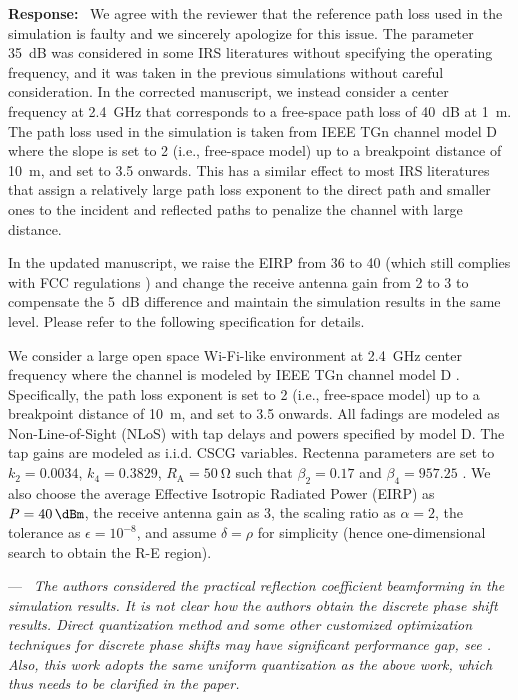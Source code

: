 \documentclass{article}
\newcounter{reviewer}
\newcounter{point}[reviewer]
\newcounter{response}[reviewer]
\renewcommand{\thepoint}
	{\thereviewer.\arabic{point}}
\newenvironment{point}
	{\refstepcounter{point} \bigskip \noindent {\textbf{Comment~\thepoint} } ---\ \itshape}
	{\par}
\newenvironment{response}
	{\refstepcounter{response} \medskip \noindent \textbf{Response:}\ }
	{\medskip}
\begin{document}
\begin{reviewer}
		\begin{response}
			We agree with the reviewer that the reference path loss used in the simulation is faulty and we sincerely apologize for this issue. The parameter \SI{35}{\dB} was considered in some IRS literatures without specifying the operating frequency, and it was taken in the previous simulations without careful consideration. In the corrected manuscript, we instead consider a center frequency at \SI{2.4}{\GHz} that corresponds to a free-space path loss of \SI{40}{\dB} at \SI{1}{\meter}. The path loss used in the simulation is taken from IEEE TGn channel model D \cite{M-Erceg2004} where the slope is set to \num{2} (i.e., free-space model) up to a breakpoint distance of \SI{10}{\meter}, and set to \num{3.5} onwards. This has a similar effect to most IRS literatures that assign a relatively large path loss exponent to the direct path and smaller ones to the incident and reflected paths to penalize the channel with large distance.

			In the updated manuscript, we raise the EIRP from \SI{36}{\dBm} to \SI{40}{\dBm} (which still complies with FCC regulations \cite{Afar2021}) and change the receive antenna gain from \SI{2}{\dBi} to \SI{3}{\dBi} to compensate the \SI{5}{\dB} difference and maintain the simulation results in the same level. Please refer to the following specification for details.
			\begin{framed}
				We consider a large open space Wi-Fi-like environment at \SI{2.4}{\GHz} center frequency where the channel is modeled by IEEE TGn channel model D \cite{M-Erceg2004}. Specifically, the path loss exponent is set to \num{2} (i.e., free-space model) up to a breakpoint distance of \SI{10}{\meter}, and set to \num{3.5} onwards. All fadings are modeled as Non-Line-of-Sight (NLoS) with tap delays and powers specified by model D. The tap gains are modeled as i.i.d. CSCG variables. Rectenna parameters are set to $k_2=0.0034$, $k_4=0.3829$, $R_{\mathrm{A}}=\SI{50}{\ohm}$ such that $\beta_2=0.17$ and $\beta_4=957.25$ \cite{M-Clerckx2016a}. We also choose the average Effective Isotropic Radiated Power (EIRP) as $P=\SI{40}{\dBm}$, the receive antenna gain as \SI{3}{\dBi}, the scaling ratio as $\alpha=2$, the tolerance as $\epsilon=10^{-8}$, and assume $\delta=\rho$ for simplicity (hence one-dimensional search to obtain the R-E region).
			\end{framed}
		\end{response}

		\begin{point}
			The authors considered the practical reflection coefficient beamforming in the simulation results. It is not clear how the authors obtain the discrete phase shift results. Direct quantization method and some other customized optimization techniques for discrete phase shifts may have significant performance gap, see \cite{Wu2020c}. Also, this work adopts the same uniform quantization as the above work, which thus needs to be clarified in the paper.
		\end{point}


\end{reviewer}
\end{document}
